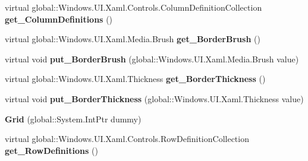 \begin{DoxyCompactItemize}
\item 
\mbox{\label{class_windows_1_1_u_i_1_1_xaml_1_1_controls_1_1_grid_a4e77f5fdadc303d53031e20fcabf5fc6}} 
virtual global\+::\+Windows.\+U\+I.\+Xaml.\+Controls.\+Column\+Definition\+Collection {\bfseries get\+\_\+\+Column\+Definitions} ()
\item 
\mbox{\label{class_windows_1_1_u_i_1_1_xaml_1_1_controls_1_1_grid_a56ab844ebf9b8faa820b652c2c5e592b}} 
virtual global\+::\+Windows.\+U\+I.\+Xaml.\+Media.\+Brush {\bfseries get\+\_\+\+Border\+Brush} ()
\item 
\mbox{\label{class_windows_1_1_u_i_1_1_xaml_1_1_controls_1_1_grid_a27800ef05d364a3b9417b09943ae92bf}} 
virtual void {\bfseries put\+\_\+\+Border\+Brush} (global\+::\+Windows.\+U\+I.\+Xaml.\+Media.\+Brush value)
\item 
\mbox{\label{class_windows_1_1_u_i_1_1_xaml_1_1_controls_1_1_grid_ae403f1f4e529c68e04423bf21fc36cc7}} 
virtual global\+::\+Windows.\+U\+I.\+Xaml.\+Thickness {\bfseries get\+\_\+\+Border\+Thickness} ()
\item 
\mbox{\label{class_windows_1_1_u_i_1_1_xaml_1_1_controls_1_1_grid_a7ec7f388cb8d2882e412b29d60fb8e78}} 
virtual void {\bfseries put\+\_\+\+Border\+Thickness} (global\+::\+Windows.\+U\+I.\+Xaml.\+Thickness value)
\item 
\mbox{\label{class_windows_1_1_u_i_1_1_xaml_1_1_controls_1_1_grid_a8a9435e4defeeee271d7eef51280e839}} 
{\bfseries Grid} (global\+::\+System.\+Int\+Ptr dummy)
\item 
\mbox{\label{class_windows_1_1_u_i_1_1_xaml_1_1_controls_1_1_grid_a462adf0bcc5ff89fd6198b69ea3935aa}} 
virtual global\+::\+Windows.\+U\+I.\+Xaml.\+Controls.\+Row\+Definition\+Collection {\bfseries get\+\_\+\+Row\+Definitions} ()
\item 
\mbox{\label{class_windows_1_1_u_i_1_1_xaml_1_1_controls_1_1_grid_a4e77f5fdadc303d53031e20fcabf5fc6}} 

\end{DoxyCompactItemize}
